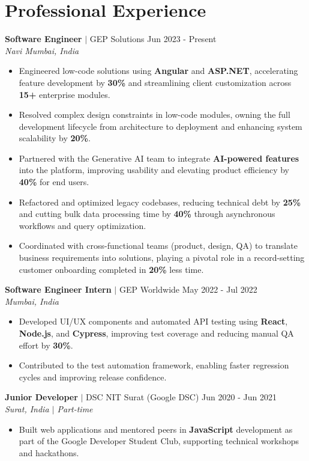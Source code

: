 \documentclass[letterpaper,10pt]{article}
\newcommand{\jobheader}[4]{%
  \noindent\textbf{#1} $\vert$ #2 \hfill #3 \\
  \textit{\small #4}\vspace{1pt}
}
\begin{document}
\section{Professional Experience}

\jobheader{Software Engineer}{GEP Solutions}{Jun 2023 - Present}{Navi Mumbai, India}
\begin{itemize}
  \item Engineered low-code solutions using \textbf{Angular} and \textbf{ASP.NET}, accelerating feature development by \textbf{30\%} and streamlining client customization across \textbf{15+} enterprise modules.
  \item Resolved complex design constraints in low-code modules, owning the full development lifecycle from architecture to deployment and enhancing system scalability by \textbf{20\%}.
  \item Partnered with the Generative AI team to integrate \textbf{AI-powered features} into the platform, improving usability and elevating product efficiency by \textbf{40\%} for end users.
  \item Refactored and optimized legacy codebases, reducing technical debt by \textbf{25\%} and cutting bulk data processing time by \textbf{40\%} through asynchronous workflows and query optimization.
  \item Coordinated with cross-functional teams (product, design, QA) to translate business requirements into solutions, playing a pivotal role in a record-setting customer onboarding completed in \textbf{20\%} less time.
\end{itemize}

\jobheader{Software Engineer Intern}{GEP Worldwide}{May 2022 - Jul 2022}{Mumbai, India}
\begin{itemize}
  \item Developed UI/UX components and automated API testing using \textbf{React}, \textbf{Node.js}, and \textbf{Cypress}, improving test coverage and reducing manual QA effort by \textbf{30\%}.
  \item Contributed to the test automation framework, enabling faster regression cycles and improving release confidence.
\end{itemize}

\jobheader{Junior Developer}{DSC NIT Surat (Google DSC)}{Jun 2020 - Jun 2021}{Surat, India $\vert$ Part-time}
\begin{itemize}
  \item Built web applications and mentored peers in \textbf{JavaScript} development as part of the Google Developer Student Club, supporting technical workshops and hackathons.
\end{itemize}
\end{document}
